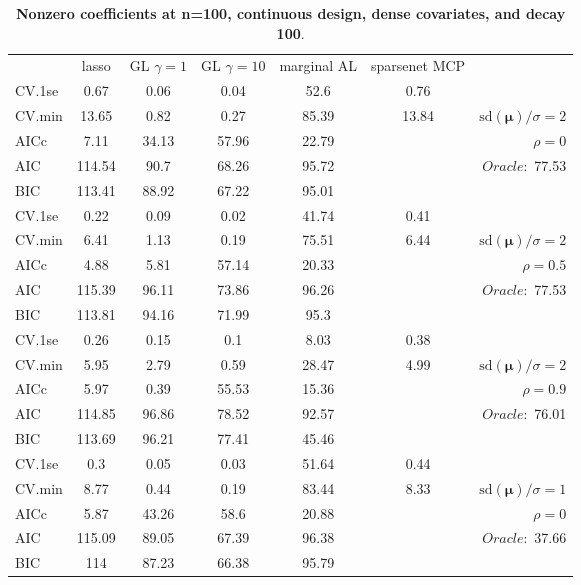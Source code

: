 \clearpage
\begin{table}\vspace{-.5cm}
\caption[l]{ { \bf Nonzero coefficients at n=100, continuous design, 
dense covariates, and  decay  100}.}
\vspace{-.5cm}
\footnotesize{}
\begin{center}
\begin{tabular}{l*{5}{c}|r}
& lasso & GL $\gamma=1$ & GL $\gamma=10$ & marginal AL & sparsenet MCP  & \\
 \cline{1-7}
CV.1se & 0.67 & 0.06 & 0.04 & 52.6 & 0.76 & \\
CV.min & 13.65 & 0.82 & 0.27 & 85.39 & 13.84 &  $\mathrm{sd}(\mathbf{\mu})/\sigma=2$ \\
AICc & 7.11 & 34.13 & 57.96 & 22.79 & & $\rho=0$ \\
AIC & 114.54 & 90.7 & 68.26 & 95.72 & &  \multirow{2}{*}{$Oracle: $ 77.53} \\
BIC & 113.41 & 88.92 & 67.22 & 95.01 & &  \\
 \hline 
CV.1se & 0.22 & 0.09 & 0.02 & 41.74 & 0.41 & \\
CV.min & 6.41 & 1.13 & 0.19 & 75.51 & 6.44 &  $\mathrm{sd}(\mathbf{\mu})/\sigma=2$ \\
AICc & 4.88 & 5.81 & 57.14 & 20.33 & & $\rho=0.5$ \\
AIC & 115.39 & 96.11 & 73.86 & 96.26 & &  \multirow{2}{*}{$Oracle: $ 77.53} \\
BIC & 113.81 & 94.16 & 71.99 & 95.3 & &  \\
 \hline 
CV.1se & 0.26 & 0.15 & 0.1 & 8.03 & 0.38 & \\
CV.min & 5.95 & 2.79 & 0.59 & 28.47 & 4.99 &  $\mathrm{sd}(\mathbf{\mu})/\sigma=2$ \\
AICc & 5.97 & 0.39 & 55.53 & 15.36 & & $\rho=0.9$ \\
AIC & 114.85 & 96.86 & 78.52 & 92.57 & &  \multirow{2}{*}{$Oracle: $ 76.01} \\
BIC & 113.69 & 96.21 & 77.41 & 45.46 & &  \\
 \hline 
CV.1se & 0.3 & 0.05 & 0.03 & 51.64 & 0.44 & \\
CV.min & 8.77 & 0.44 & 0.19 & 83.44 & 8.33 &  $\mathrm{sd}(\mathbf{\mu})/\sigma=1$ \\
AICc & 5.87 & 43.26 & 58.6 & 20.88 & & $\rho=0$ \\
AIC & 115.09 & 89.05 & 67.39 & 96.38 & &  \multirow{2}{*}{$Oracle: $ 37.66} \\
BIC & 114 & 87.23 & 66.38 & 95.79 & &  \\

\end{tabular}
\end{center}
\end{table}
